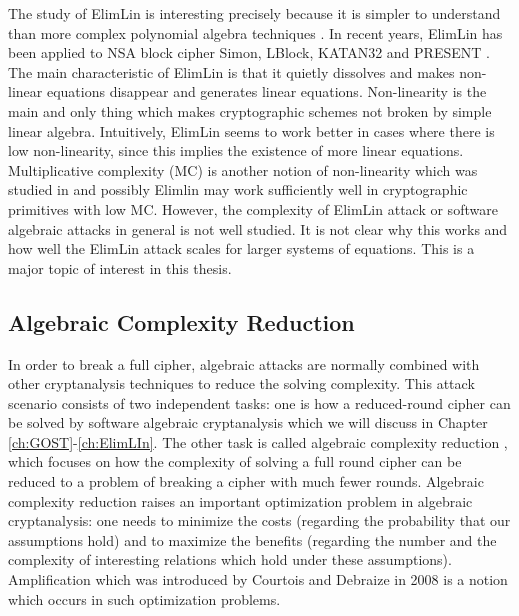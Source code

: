 The study of ElimLin is interesting \cite{ElimLinRevisit,ElimLinUniversalEqs}
precisely because it is simpler to understand than more complex
polynomial algebra techniques \cite{XL,XL2,XLAsEstCourt04,Bardet,DoSemiRegularSequencesExist}. In recent years, ElimLin has been applied to NSA block cipher Simon, LBlock, KATAN32 and PRESENT \cite{courtois2014combined,RaddumSimon,ElimLinUniversalEqs,nakahara2009linear}. The main characteristic of ElimLin is that it quietly dissolves
and makes non-linear equations disappear and generates linear equations. Non-linearity is the main and only thing which makes cryptographic schemes not broken by simple linear algebra. Intuitively, ElimLin seems to work better in cases where there is low non-linearity, since this implies the existence of more linear equations.  Multiplicative complexity (MC) is another notion of non-linearity which was studied in \cite{FourMNL,OptimiPaper2,TheoPhD} and possibly Elimlin may work sufficiently well in cryptographic primitives with low MC.
However, the complexity of ElimLin attack or software algebraic attacks in general is not well studied. It is not clear why this works and how well the ElimLin attack scales for larger systems of equations. This is a major topic of interest in this thesis.

%

\subsection{Algebraic Complexity Reduction} \label{sec:ACReduction}

In order to break a full cipher, algebraic attacks are normally combined with other cryptanalysis techniques to reduce the solving complexity. This attack scenario consists of two independent tasks: one is how a reduced-round cipher can be solved by software algebraic cryptanalysis which we will discuss in Chapter \ref{ch:GOST}-\ref{ch:ElimLIn}. The other task is called algebraic complexity reduction \cite{gostreport,gostac}, which focuses on how the complexity of solving a full round cipher can be reduced to a problem of breaking a cipher with much fewer rounds. Algebraic complexity reduction raises an important optimization problem in algebraic cryptanalysis: one needs to minimize the costs (regarding the probability that our assumptions hold) and to maximize the benefits (regarding the number and the complexity of interesting relations
which hold under these assumptions).  Amplification which was introduced by Courtois and Debraize in 2008 \cite{AlgSnowCourtoisDebraize} is a notion which occurs in such optimization problems.

